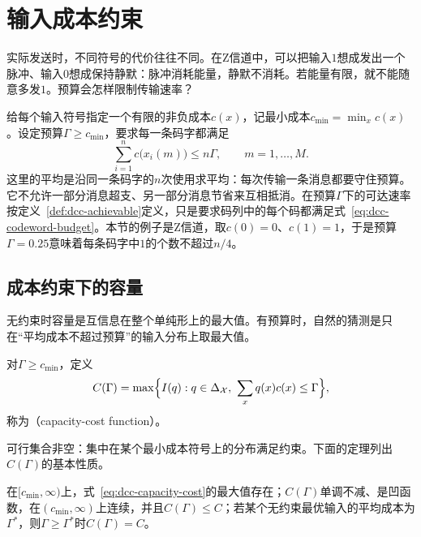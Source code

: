 \section{输入成本约束}
\label{sec:dcc-costs}

实际发送时，不同符号的代价往往不同。在Z信道中，可以把输入$1$想成发出一个脉冲、输入$0$想成保持静默：脉冲消耗能量，静默不消耗。若能量有限，就不能随意多发$1$。预算会怎样限制传输速率？

给每个输入符号指定一个有限的非负成本$c(x)$，记最小成本$c_{\min}=\min_xc(x)$。设定预算$\Gamma\geq c_{\min}$，要求每一条码字都满足
\begin{equation}
 \sum_{i=1}^{n}c\bigl(x_i(m)\bigr)\leq n\Gamma,\qquad m=1,\dots,M .
 \label{eq:dcc-codeword-budget}
\end{equation}
这里的平均是沿同一条码字的$n$次使用求平均：每次传输一条消息都要守住预算。它不允许一部分消息超支、另一部分消息节省来互相抵消。在预算$\Gamma$下的可达速率按定义~\ref{def:dcc-achievable}定义，只是要求码列中的每个码都满足式~\eqref{eq:dcc-codeword-budget}。本节的例子是Z信道，取$c(0)=0$、$c(1)=1$，于是预算$\Gamma=0.25$意味着每条码字中$1$的个数不超过$n/4$。

\subsection{成本约束下的容量}
\label{sec:dcc-cost-capacity}

无约束时容量是互信息在整个单纯形上的最大值。有预算时，自然的猜测是只在“平均成本不超过预算”的输入分布上取最大值。

\begin{definition}[容量—成本函数]
\label{def:dcc-capacity-cost}
对$\Gamma\geq c_{\min}$，定义
\begin{equation}
 C(\Gamma)=\max\Bigl\{I(q):q\in\Delta_{\mathcal{X}},\ \sum_{x}q(x)c(x)\leq\Gamma\Bigr\} ,
 \label{eq:dcc-capacity-cost}
\end{equation}
称为（capacity-cost function）。
\end{definition}

可行集合非空：集中在某个最小成本符号上的分布满足约束。下面的定理列出$C(\Gamma)$的基本性质。

\begin{theorem}[容量—成本函数的性质]
\label{thm:dcc-capacity-cost}
在$[c_{\min},\infty)$上，式~\eqref{eq:dcc-capacity-cost}的最大值存在；$C(\Gamma)$单调不减、是凹函数，在$(c_{\min},\infty)$上连续，并且$C(\Gamma)\leq C$；若某个无约束最优输入的平均成本为$\Gamma^{*}$，则$\Gamma\geq\Gamma^{*}$时$C(\Gamma)=C$。
\end{theorem}

